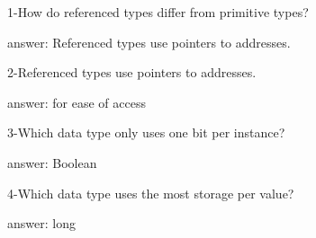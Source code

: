 1-How do referenced types differ from primitive types?

answer: Referenced types use pointers to addresses.

2-Referenced types use pointers to addresses.

answer: for ease of access

3-Which data type only uses one bit per instance?

answer: Boolean

4-Which data type uses the most storage per value?

answer: long
